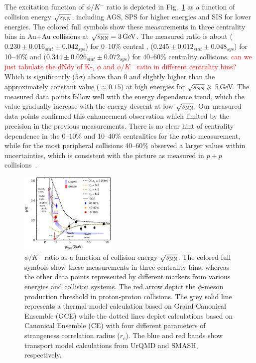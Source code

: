 \documentclass[%
 reprint,	
showpacs,
 amsmath,amssymb,
 aps,
 prc,
]{revtex4-1}
\begin{document}
The excitation function of $\phi/K^-$ ratio is depicted in Fig.~\ref{fig:phi2Kratio} as a function of collision energy $\sqrt{s_{\rm NN}}$, including AGS, SPS for higher energies and SIS for lower energies. The colored full symbols show these measurements in three centrality bins in Au+Au collisions at ${\sqrt{s_{\rm NN}} = \rm{3\,GeV}}$. The measured ratio is about ($0.230\pm0.016_{stat}\pm0.042_{sys}$) for 0--10\% central , ($0.245\pm0.012_{stat}\pm0.048_{sys}$) for 10--40\% and ($0.344\pm0.026_{stat}\pm0.072_{sys}$) for 40--60\% centrality collisions.
\textcolor{red}{can we just tabulate the dNdy of K-, $\phi$ and $\phi/K^-$ ratio in different centrality bins?}
Which is significantly ($5\sigma$) above than 0 and slightly higher than the approximately constant value ($\approx0.15$) at high energies for $\sqrt{s_{\rm NN}}\geqslant$ 5\,GeV. The measured data points follow well with the energy dependence trend, which the value gradually increase with the energy descent at low $\sqrt{s_{\rm NN}}$. Our measured data points confirmed this enhancement observation which limited by the precision in the previous measurements. There is no clear hint of centrality dependence in the 0--10\% and 10--40\% centralities for the ratio measurement, while for the most peripheral collisions 40--60\% observed a larger values within uncertainties, which is consistent with the picture as measured in $p+p$ collisions~\cite{PhysRevC.77.015204}.


\begin{figure}
\centering
\includegraphics[width=0.41\textwidth]{fig/fig4_phi_over_kminus_zoomin.eps}
  \caption{ $\phi/K^-$ ratio as a function of collision energy $\sqrt{s_{\rm NN}}$. The colored full symbols show these measurements in three centrality bins, whereas the other data points represented by different markers from various energies and collision systems. The red arrow depict the $\phi$-meson production threshold in proton-proton collisions. The grey solid line represents a thermal model calculation based on Grand Canonical Ensemble (GCE) while the dotted lines depict calculations based on Canonical Ensemble (CE) with four different parameters of strangeness correlation radius ($r_c$). The blue and red bands show transport model calculations from UrQMD and SMASH, respectively.}
\label{fig:phi2Kratio} 
\end{figure}
\end{document}
